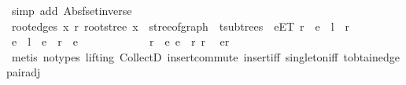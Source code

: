 \begin{isabellebody}
\ {\isacharparenleft}{\kern0pt}simp\ add{\isacharcolon}{\kern0pt}\ Abs{\isacharunderscore}{\kern0pt}fset{\isacharunderscore}{\kern0pt}inverse{\isacharparenright}{\kern0pt}\isanewline
\isanewline
\ \ \isamarkupfalse%
\ root{\isacharunderscore}{\kern0pt}edges{\isacharcolon}{\kern0pt}\ {\isachardoublequoteopen}{\isacharparenleft}{\kern0pt}{\isasymlambda}x{\isachardot}{\kern0pt}\ {\isacharbraceleft}{\kern0pt}r{\isacharcomma}{\kern0pt}\ root{\isacharunderscore}{\kern0pt}stree\ x{\isacharbraceright}{\kern0pt}{\isacharparenright}{\kern0pt}\ {\isacharbackquote}{\kern0pt}\ stree{\isacharunderscore}{\kern0pt}of{\isacharunderscore}{\kern0pt}graph\ {\isacharbackquote}{\kern0pt}\ t{\isachardot}{\kern0pt}subtrees\ {\isacharequal}{\kern0pt}\ {\isacharbraceleft}{\kern0pt}e{\isasymin}E\isactrlsub T{\isachardot}{\kern0pt}\ r\ {\isasymin}\ e{\isacharbraceright}{\kern0pt}{\isachardoublequoteclose}\ {\isacharparenleft}{\kern0pt}\ {\isachardoublequoteopen}{\isacharquery}{\kern0pt}l\ {\isacharequal}{\kern0pt}\ {\isacharquery}{\kern0pt}r{\isachardoublequoteclose}{\isacharparenright}{\kern0pt}\isanewline
\ \ \isamarkupfalse%
{\isacharminus}{\kern0pt}\isanewline
\ \ \ \ \isamarkupfalse%
\ {\isachardoublequoteopen}e\ {\isasymin}\ {\isacharquery}{\kern0pt}l{\isachardoublequoteclose}\ \ {\isachardoublequoteopen}e\ {\isasymin}\ {\isacharquery}{\kern0pt}r{\isachardoublequoteclose}\ \ e\isanewline
\ \ \ \ \isamarkupfalse%
{\isacharminus}{\kern0pt}\isanewline
\ \ \ \ \ \ \isamarkupfalse%
\ r{\isacharprime}{\kern0pt}\ \ e{\isacharcolon}{\kern0pt}\ {\isachardoublequoteopen}e\ {\isacharequal}{\kern0pt}\ {\isacharbraceleft}{\kern0pt}r{\isacharcomma}{\kern0pt}\ r{\isacharprime}{\kern0pt}{\isacharbraceright}{\kern0pt}{\isachardoublequoteclose}\ \isamarkupfalse%
\ {\isacartoucheopen}e{\isasymin}{\isacharquery}{\kern0pt}r{\isacartoucheclose}\isanewline
\ \ \ \ \ \ \ \ \isamarkupfalse%
\ {\isacharparenleft}{\kern0pt}metis\ {\isacharparenleft}{\kern0pt}no{\isacharunderscore}{\kern0pt}types{\isacharcomma}{\kern0pt}\ lifting{\isacharparenright}{\kern0pt}\ CollectD\ insert{\isacharunderscore}{\kern0pt}commute\ insert{\isacharunderscore}{\kern0pt}iff\ singleton{\isacharunderscore}{\kern0pt}iff\ t{\isachardot}{\kern0pt}obtain{\isacharunderscore}{\kern0pt}edge{\isacharunderscore}{\kern0pt}pair{\isacharunderscore}{\kern0pt}adj{\isacharparenright}{\kern0pt}\isanewline
\ \ \ \ \ \ \isamarkupfalse%
\ \isamarkupfalse%

\end{isabellebody}
